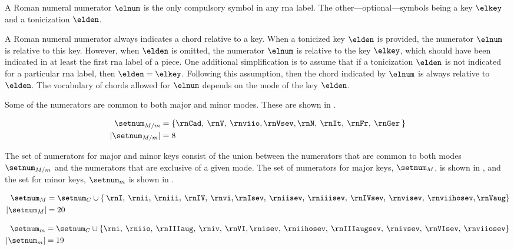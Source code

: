 
A Roman numeral numerator $\elnum$ is the only compulsory
symbol in any \gls{rna} label. The
other---optional---symbols being a key $\elkey$ and a
tonicization $\elden$.

A Roman numeral numerator always indicates a chord relative
to a key. When a tonicized key $\elden$ is provided, the
numerator $\elnum$ is relative to this key. However, when
$\elden$ is omitted, the numerator $\elnum$ is relative to
the key $\elkey$, which should have been indicated in at
least the first \gls{rna} label of a piece. One additional
simplification is to assume that if a tonicization $\elden$
is not indicated for a particular \gls{rna} label, then
$\elden = \elkey$. Following this assumption, then the chord
indicated by $\elnum$ is always relative to $\elden$. The
vocabulary of chords allowed for $\elnum$ depends on the
mode of the key $\elden$.

Some of the numerators are common to both major and minor
modes. These are shown in . 

\begin{equation}
    \label{eq:common_numerators}
    \begin{split}
    \setnum_{M/m} &= \{ \rnCad, \: \rnV, \: \rnviio,
    \rnVsev, \rnN, \: \rnIt, \: \rnFr, \: \rnGer \: \} \\
    | \setnum_{M/m} | &= 8
    \end{split}
\end{equation}

The set of numerators for major and minor keys consist of
the union between the numerators that are common to both
modes $\setnum_{M/m}$ and the numerators that are exclusive
of a given mode. The set of numerators for major keys,
$\setnum_{M}$, is shown in , and the
set for minor keys, $\setnum_{m}$ is shown in
.

\begin{equation}
    \label{eq:major_numerators}
    \begin{split}
    \setnum_{M} &= \setnum_{C} \cup \{ \: \rnI, \: \rnii, \: 
    \rniii, \: \rnIV, \: \rnvi, \rnIsev, \: \rniisev, \: 
    \rniiisev, \: \rnIVsev, \: \rnvisev, \: \rnviihosev, \rnVaug \} \\
    | \setnum_{M} | &= 20
    \end{split}
\end{equation}

\begin{equation}
    \label{eq:minor_numerators}
    \begin{split}
    \setnum_{m} &= \setnum_{C} \cup  \{ \rni, \: \rniio, \: 
    \rnIIIaug, \: \rniv, \: \rnVI, \rnisev, \: \rniihosev, \: 
    \rnIIIaugsev, \: \rnivsev, \: \rnVIsev, \: \rnviiosev \} \\
    | \setnum_{m} | &= 19
    \end{split}
\end{equation}


